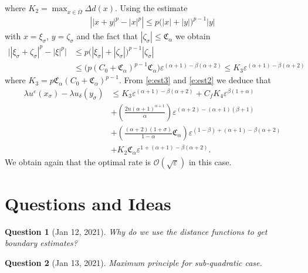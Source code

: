 \documentclass[11pt,reqno]{amsart}
\numberwithin{figure}{section}
\theoremstyle{plain}
\newtheorem{quest}{Question}
\theoremstyle{remark}
\numberwithin{equation}{section}
\begin{document}
where $K_2 = \max_{x\in \overline{\Omega}}\Delta d(x)$. Using the estimate
\begin{align*}
    \left||x+y|^p - |x|^p \right| \leq  p\big(|x|+|y|\big)^{p-1}|y|
\end{align*}
with $x = \xi_\sigma$, $y = \zeta_\sigma$ and the fact that $|\zeta_\sigma|\leq \mathfrak{C}_\alpha$ we obtain
\begin{align}
    \Big||\xi_\sigma+\zeta_\sigma|^p - |\xi|^p\Big| &\leq p\Big(|\xi_\sigma|+|\zeta_\sigma|\Big)^{p-1}|\zeta_\sigma| \nonumber \\
    &\leq \Big( p(C_0 + \mathfrak{C}_\alpha)^{p-1}\mathfrak{C}_\alpha \Big) \varepsilon^{(\alpha+1) -\beta(\alpha+2)} \leq K_3\varepsilon ^{(\alpha+1)  - \beta(\alpha+2)}\label{e:est2}
\end{align}
where $K_3 = p\mathfrak{C}_\alpha(C_0+\mathfrak{C}_\alpha)^{p-1}$. From \eqref{e:est3} and \eqref{e:est2} we deduce that
\begin{align*}
    \lambda u^\varepsilon(x_\sigma) - \lambda u_\delta(y_\sigma) &\leq  K_3 \varepsilon^{(\alpha+1) - \beta(\alpha+2)}  + C_fK_4 \varepsilon^{\beta(1+\alpha)} \\
    &+ \left(\frac{2n(\alpha+1)^{\alpha+1}}{\alpha}\right)\varepsilon^{(\alpha+2) - (\alpha+1)(\beta+1)}\\
    &+ \left(\frac{(\alpha+2)(1+\sigma)}{1-\alpha}\mathfrak{C}_\alpha\right)\varepsilon^{(1-\beta) + (\alpha+1) - \beta(\alpha+2)}\\
    &+ K_2\mathfrak{C}_\alpha \varepsilon^{1+(\alpha+1)-\beta(\alpha+2)}.
\end{align*}
We obtain again that the optimal rate is $\mathcal{O}(\sqrt{\varepsilon})$ in this case.

\section{Questions and Ideas}
\begin{quest} [Jan 12, 2021] Why do we use the distance functions to get boundary estimates? 
\end{quest}

\begin{quest} [Jan 13, 2021] Maximum principle for sub-quadratic case.
\end{quest}
\end{document}
